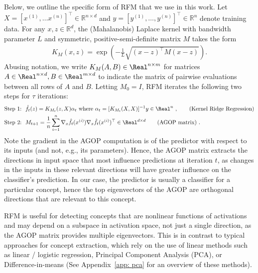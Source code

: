 Below, we outline the specific form of RFM that we use in this work.   Let $X = [x^{(1)}, \ldots x^{(n)} ]^\top \in \mathbb{R}^{n \times d}$ and $y = [y^{(1)}, \ldots, y^{(n)}]^\top \in \mathbb{R}^{n}$ denote training data.  For any $x, z \in \mathbb{R}^{d}$, the (Mahalanobis) Laplace kernel with bandwidth parameter $L$ and symmetric, positive-semi-definite matrix $M$ takes the form 
\begin{align}
K_M(x, z) = \exp\left(-\frac{1}{L}\sqrt{ (x-z)^\top M (x-z)} \right).   
\end{align}  
Abusing notation, we write $K_M(A,B) \in \Real^{n \times m}$ for matrices $A \in \Real^{n \times d}, B \in \Real^{m \times d}$ to indicate the matrix of pairwise evaluations between all rows of $A$ and $B$. Letting $M_0 = I$, RFM iterates the following two steps for $\tau$ iterations:
\begin{align}
    &\text{Step 1:}~~ \hat{f}_t(z) = K_{M_t}(z, X) \alpha_t  ~\text{where}~ \alpha_t = [K_{M_t}(X, X)]^{-1} y \in \Real^{n}~, \tag{Kernel Ridge Regression}\\
    & \text{Step 2:}~~ M_{t+1} = \frac{1}{n}\sum_{i=1}^{n} \nabla_x \hat{f}_t(x^{(i)}) \nabla_x \hat{f}_t(x^{(i)})^\top \in \Real^{d \times d} \label{eq: agop} \tag{AGOP matrix}~.
\end{align}
\noindent Note the gradient in the AGOP computation is of the predictor with respect to its inputs (and not, e.g., its parameters). Hence, the AGOP matrix extracts the directions in input space that most influence predictions at iteration $t$, as changes in the inputs in these relevant directions will have greater influence on the classifier's prediction. In our case, the predictor is usually a classifier for a particular concept, hence the top eigenvectors of the AGOP are orthogonal directions that are relevant to this concept.

RFM is useful for detecting concepts that are nonlinear functions of activations and may depend on a subspace in activation space, not just a single direction, as the AGOP matrix provides multiple eigenvectors. This is in contrast to typical approaches for concept extraction, which rely on the use of linear methods such as linear / logistic regression, Principal Component Analysis (PCA), or Difference-in-means (See Appendix~\ref{app: pca} for an overview of these methods). 


